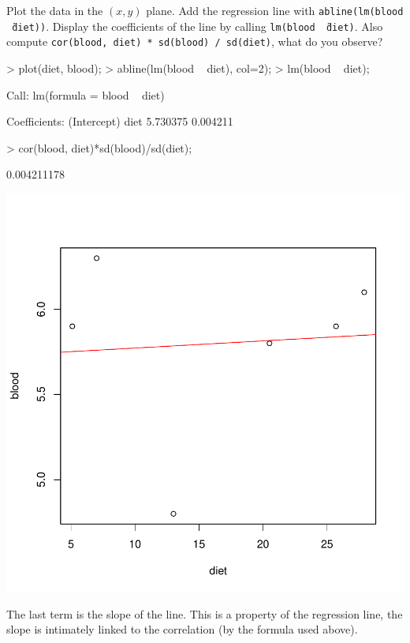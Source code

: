 \documentclass[a4paper]{article}
\theoremstyle{definition}
\begin{document}
\begin{Exercise}
Plot the data in the $(x,y)$ plane. Add the regression line with
\texttt{abline(lm(blood \~\ diet))}. Display the coefficients of
the line by calling \texttt{lm(blood \~\ diet)}. Also compute
\texttt{cor(blood, diet) * sd(blood) / sd(diet)}, what do you observe?
\end{Exercise}
\begin{Answer}
\begin{Schunk}
\begin{Sinput}
> plot(diet, blood);
> abline(lm(blood ~ diet), col=2);
> lm(blood ~ diet);
\end{Sinput}
\begin{Soutput}
Call:
lm(formula = blood ~ diet)

Coefficients:
(Intercept)         diet  
   5.730375     0.004211  
\end{Soutput}
\begin{Sinput}
> cor(blood, diet)*sd(blood)/sd(diet);
\end{Sinput}
\begin{Soutput}
[1] 0.004211178
\end{Soutput}
\end{Schunk}
\includegraphics{correlation-002}
\par
The last term is the slope of the line. This is a property of the
regression line, the slope is intimately linked to the correlation
(by the formula used above).
\end{Answer}
\end{document}
